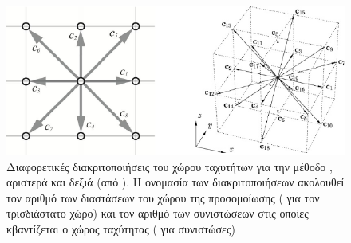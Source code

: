 \begin{figure}[]
  \centering
  \includegraphics[width=\textwidth]{figures/lb-lattices-2.pdf}
  \caption[Διακριτοποίηση χώρου κατάστασης ] {Διαφορετικές διακριτοποιήσεις του
    χώρου ταχυτήτων για την μέθοδο , αριστερά  και δεξιά 
    (από  \cite{duchateau2015}). Η ονομασία των
    διακριτοποιήσεων ακολουθεί τον αριθμό των διαστάσεων του χώρου της προσομοίωσης
    ( για τον τρισδιάστατο χώρο) και τον αριθμό των συνιστώσεων στις οποίες
    κβαντίζεται ο χώρος ταχύτητας ( για  συνιστώσες)}
  \label{fig:lb-lattices}
\end{figure}

